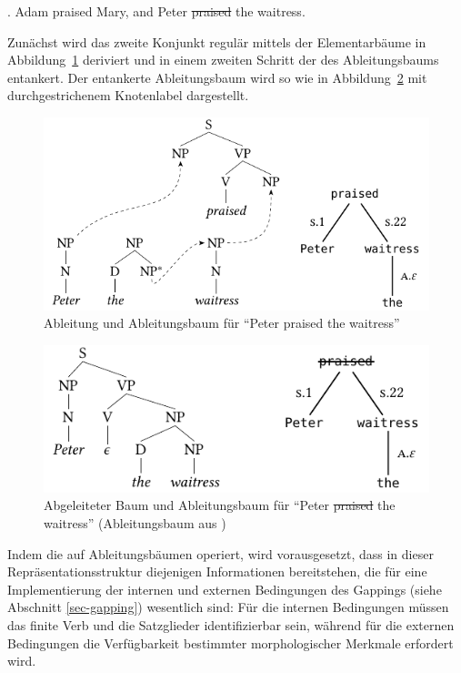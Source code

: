 \ex. \label{ex-deanchoring-1} Adam praised Mary, and Peter \sout{praised} the waitress.   
  
Zunächst wird das zweite Konjunkt regulär mittels der Elementarbäume in Abbildung~\ref{fig-deanchoring-1} deriviert und in einem zweiten Schritt der  des Ableitungsbaums entankert. Der entankerte Ableitungsbaum wird so wie in Abbildung~\ref{fig-deanchoring-2} mit durchgestrichenem Knotenlabel dargestellt. 

\begin{figure}[t]
\centering
\includegraphics{graphics/abb814.pdf}
\caption{\label{fig-deanchoring-1}Ableitung und Ableitungsbaum für "`Peter praised the waitress"' \citep[Figure~4]{Lichte:Kallmeyer:10}}
\end{figure}
 

\begin{figure}[t]
\centering
\includegraphics{graphics/abb815.pdf}
\caption{\label{fig-deanchoring-2}Abgeleiteter Baum und Ableitungsbaum für "`Peter \sout{praised} the waitress"' (Ableitungsbaum aus \citealt[Figure~2]{Lichte:Kallmeyer:10})}
\end{figure}

Indem die  auf Ableitungsbäumen operiert, wird vorausgesetzt, dass in dieser Repräsentationsstruktur diejenigen Informationen bereitstehen, die für eine Implementierung der internen und externen Bedingungen des Gappings (siehe Abschnitt \ref{sec-gapping}) wesentlich sind: Für die internen Bedingungen müssen das finite Verb und die Satzglieder identifizierbar sein, während für die externen Bedingungen die Verfügbarkeit bestimmter morphologischer Merkmale erfordert wird.

